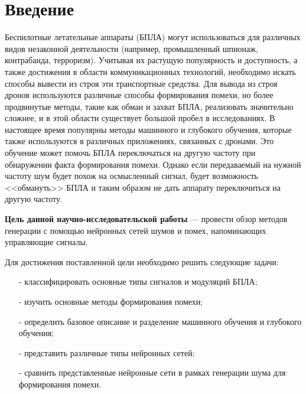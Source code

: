 \chapter*{Введение}

Беспилотные летательные аппараты (БПЛА) могут использоваться для различных видов незаконной деятельности (например, промышленный шпионаж, контрабанда, терроризм). Учитывая их растущую популярность и доступность, а также достижения в области коммуникационных технологий, необходимо искать способы вывести из строя эти транспортные средства. Для вывода из строя дронов используются различные способы формирования помехи, но более продвинутые методы, такие как обман и захват БПЛА, реализовать значительно сложнее, и в этой области существует большой пробел в исследованиях. В настоящее время популярны методы машинного и глубокого обучения, которые также используются в различных приложениях, связанных с дронами. Это обучение может помочь БПЛА переключаться на другую частоту при обнаружении факта формирования помехи. Однако если передаваемый на нужной частоту шум будет похож на осмысленный сигнал, будет возможность <<обмануть>> БПЛА и таким образом не дать аппарату переключиться на другую частоту.

\textbf{Цель данной научно-исследовательской работы} --- провести обзор методов генерации с помощью нейронных сетей шумов и помех, напоминающих управляющие сигналы.


Для достижения поставленной цели необходимо решить следующие задачи:
\begin{itemize}
	\item[-] классифицировать основные типы сигналов и модуляций БПЛА;
	\item[-] изучить основные методы формирования помехи;
	\item[-] определить базовое описание и разделение машинного обучения и глубокого обучения;
	\item[-] представить различные типы нейронных сетей;
	\item[-] сравнить представленные нейронные сети в рамках генерации шума для формирования помехи.
\end{itemize}